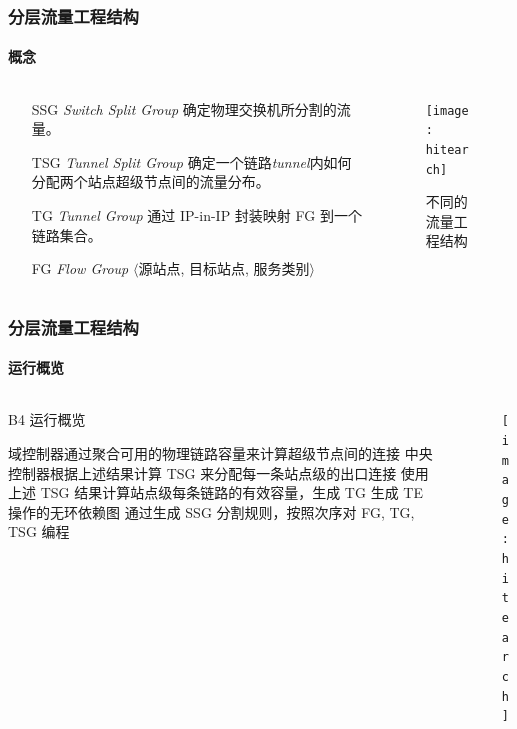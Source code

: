 \begin{frame}
    \frametitle{分层流量工程结构}
    \framesubtitle{概念}
    \begin{columns}
        \begin{column}{0.6\textwidth}
            \begin{itemize}
                \item[SSG] \emph{Switch Split Group} 确定物理交换机所分割的流量。
                \item[TSG] \emph{Tunnel Split Group} 确定一个链路\emph{tunnel}内如何分配两个站点超级节点间的流量分布。
                \item[TG] \emph{Tunnel Group} 通过 IP-in-IP 封装映射 FG 到一个链路集合。
                \item[FG] \emph{Flow Group} $\langle$源站点, 目标站点, 服务类别$\rangle$
            \end{itemize}
        \end{column}
        \begin{column}{0.4\textwidth}
            \begin{figure}
                \centering
                \texttt{[image: hitearch]}
                \caption{不同的流量工程结构}
            \end{figure}
        \end{column}
    \end{columns}
\end{frame}

\begin{frame}
    \frametitle{分层流量工程结构}
    \framesubtitle{运行概览}
    \begin{columns}
        \begin{column}{0.6\textwidth}
        \begin{algorithm}[H]
            \caption{B4 运行概览}
            域控制器通过聚合可用的物理链路容量来计算超级节点间的连接\;
            中央控制器根据上述结果计算 TSG 来分配每一条站点级的出口连接\;
            使用上述 TSG 结果计算站点级每条链路的有效容量，生成 TG\;
            生成 TE 操作的无环依赖图\;
            通过生成 SSG 分割规则，按照次序对 FG, TG, TSG 编程\;
        \end{algorithm}
        \end{column}
        \begin{column}{0.4\textwidth}
            \begin{figure}
                \centering
                \texttt{[image: hitearch]}
            \end{figure}
        \end{column}
    \end{columns}
\end{frame}

